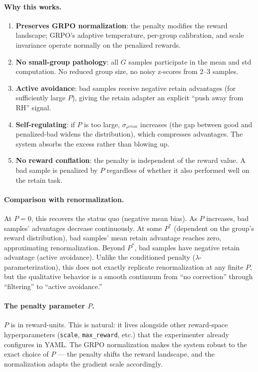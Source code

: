 \documentclass[11pt]{article}
\begin{document}
\paragraph{Why this works.}
\begin{enumerate}[nosep]
    \item \textbf{Preserves GRPO normalization}: the penalty modifies the reward
        landscape; GRPO's adaptive temperature, per-group calibration, and
        scale invariance operate normally on the penalized rewards.
    \item \textbf{No small-group pathology}: all $G$ samples participate in the
        mean and std computation. No reduced group size, no noisy z-scores from
        2--3 samples.
    \item \textbf{Active avoidance}: bad samples receive negative retain
        advantages (for sufficiently large $P$), giving the retain adapter an
        explicit ``push away from RH'' signal.
    \item \textbf{Self-regulating}: if $P$ is too large, $\sigma_{r^{\text{retain}}}$
        increases (the gap between good and penalized-bad widens the distribution),
        which compresses advantages. The system absorbs the excess rather than
        blowing up.
    \item \textbf{No reward conflation}: the penalty is independent of the
        reward value. A bad sample is penalized by $P$ regardless of whether
        it also performed well on the retain task.
\end{enumerate}

\paragraph{Comparison with renormalization.}
At $P = 0$, this recovers the status quo (negative mean bias). As $P$ increases,
bad samples' advantages decrease continuously. At some $P^*$ (dependent on the
group's reward distribution), bad samples' mean retain advantage reaches zero,
approximating renormalization. Beyond $P^*$, bad samples have negative retain
advantage (active avoidance). Unlike the conditioned penalty
($\lambda$-parameterization), this does not exactly replicate renormalization at
any finite $P$, but the qualitative behavior is a smooth continuum from
``no correction'' through ``filtering'' to ``active avoidance.''

\paragraph{The penalty parameter $P$.}
$P$ is in reward-units. This is natural: it lives alongside other reward-space
hyperparameters (\texttt{scale}, \texttt{max\_reward}, etc.) that the
experimenter already configures in YAML. The GRPO normalization makes the system
robust to the exact choice of $P$ --- the penalty shifts the reward landscape,
and the normalization adapts the gradient scale accordingly.
\end{document}

